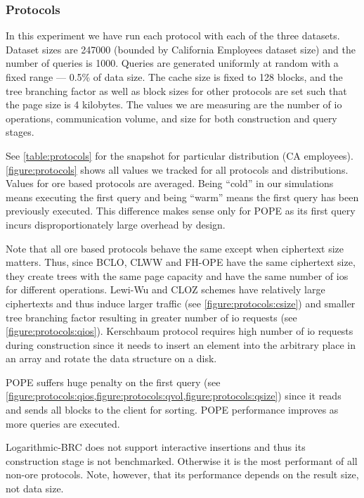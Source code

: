 		\subsubsection{Protocols}\label{section:range-snapshot:results-protocols}

			In this experiment we have run each protocol with each of the three datasets.
			Dataset sizes are 247000 (bounded by California Employees dataset size) and the number of queries is 1000.
			Queries are generated uniformly at random with a fixed range --- 0.5\% of data size.
			The cache size is fixed to 128 blocks, and the {\BPlus} tree branching factor as well as block sizes for other protocols are set such that the page size is 4 kilobytes.
			The values we are measuring are the number of \acrshort{io} operations, communication volume, and size for both construction and query stages.

			See \cref{table:protocols} for the snapshot for particular distribution (CA employees).
			\cref{figure:protocols} shows all values we tracked for all protocols and distributions.
			Values for \acrshort{ore} based protocols are averaged.
			Being ``cold'' in our simulations means executing the first query and being ``warm'' means the first query has been previously executed.
			This difference makes sense only for POPE as its first query incurs disproportionately large overhead by design.

			Note that all \acrshort{ore} based protocols behave the same except when ciphertext size matters.
			Thus, since BCLO, CLWW and FH-OPE have the same ciphertext size, they create {\BPlus} trees with the same page capacity and have the same number of \acrshort{io}s for different operations.
			Lewi-Wu and CLOZ schemes have relatively large ciphertexts and thus induce larger traffic (see \cref{figure:protocols:csize}) and smaller {\BPlus} tree branching factor resulting in greater number of \acrshort{io} requests (see \cref{figure:protocols:qios}).
			Kerschbaum protocol requires high number of \acrshort{io} requests during construction since it needs to insert an element into the arbitrary place in an array and rotate the data structure on a disk.

			POPE suffers huge penalty on the first query (see \cref{figure:protocols:qios,figure:protocols:qvol,figure:protocols:qsize}) since it reads and sends all blocks to the client for sorting.
			POPE performance improves as more queries are executed.

			Logarithmic-BRC does not support interactive insertions and thus its construction stage is not benchmarked.
			Otherwise it is the most performant of all non-\acrshort{ore} protocols.
			Note, however, that its performance depends on the result size, not data size.

